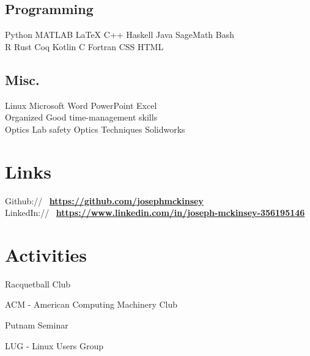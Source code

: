 \documentclass[]{deedy-resume-openfont}
\begin{document}
\begin{minipage}[t]{0.42\textwidth}
\subsection{Programming}
 Python \textbullet{} MATLAB \textbullet{} \LaTeX
\textbullet{} C++ \textbullet{}
Haskell \textbullet{} Java \textbullet{} SageMath \textbullet{} Bash \\
R \textbullet{} Rust \textbullet{} Coq \textbullet{} Kotlin \textbullet{} C
\textbullet{}  Fortran \textbullet{} CSS \textbullet{} HTML \\
\sectionsep

\subsection{Misc.}
Linux \textbullet{} Microsoft Word \textbullet PowerPoint \textbullet Excel \\
Organized \textbullet{} Good time-management skills \\
Optics Lab safety \textbullet{} Optics Techniques \textbullet{} Solidworks \\
\sectionsep



\section{Links} 
Github:// \, \href{https://github.com/josephmckinsey}{\bf https://github.com/josephmckinsey} \\
LinkedIn:// \, \href{https://www.linkedin.com/in/joseph-mckinsey-356195146/}{\bf https://www.linkedin.com/in/joseph-mckinsey-356195146} \\
\sectionsep

\section{Activities}
\vspace{\topsep} %
\begin{tightemize}
\item Racquetball Club
\item ACM - American Computing Machinery Club
\item Putnam Seminar
\item LUG - Linux Users Group
\end{tightemize}
\sectionsep

%
%

\end{minipage} 
\end{document}
